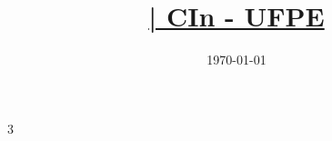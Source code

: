 \documentclass[10pt,a4paper]{article}
\title{\vspace{-5ex}\Large{\underline{\teamname{} | CIn - UFPE}}}\author{}\date{\vspace{-7ex}\tiny\today}
\begin{document}
\begin{landscape}
\begin{multicols*}{3}  %

\maketitle
\vspace{-11ex}
\tableofcontents
\pagestyle{fancy}



\end{multicols*}
\end{landscape}
\end{document}
